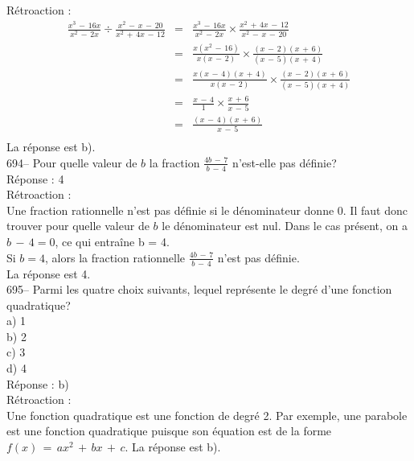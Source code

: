 ﻿\documentclass[letterpaper, 12pt]{article}
\begin{document}
R\'etroaction : \\
\begin{eqnarray*}
\frac{x^{3}\,-\,16x}{x^{2}\,-\,2x}\div
\frac{x^{2}\,-\,x\,-\,20}{x^{2}\,+\,4x\,-\,12}&=&\frac{x^{3}\,-\,16x}{x^{2}\,-\,2x}\times\frac{x^{2}\,+\,4x\,-\,12}{x^{2}\,-\,x\,-\,20}\\[2mm]
&=&\frac{x(x^{2}\,-\,16)}{x(x\,-\,2)}\times
\frac{(x\,-\,2)(x\,+\,6)}{(x\,-\,5)(x\,+\,4)}\\[2mm]
&=&\frac{x(x\,-\,4)(x\,+\,4)}{x(x\,-\,2)}\times\frac{(x\,-\,2)(x\,+\,6)}{(x\,-\,5)(x\,+\,4)}\\[2mm]
&=&\frac{x\,-\,4}{1}\times \frac{x\,+\,6}{x\,-\,5}\\[2mm]
&=&\frac{(x\,-\,4)(x\,+\,6)}{x\,-\,5}\\[2mm]
\end{eqnarray*}
La r\'eponse est b).\\

694-- Pour quelle valeur de $b$ la fraction $\frac{4b\,-\,7}{b\,-\,4}$
n'est-elle pas d\'efinie?\\

R\'eponse : 4\\

R\'etroaction : \\
Une fraction rationnelle n'est pas d\'efinie si le d\'enominateur donne 0.
Il faut donc trouver pour quelle valeur de $b$ le d\'enominateur est nul.
Dans le cas pr\'esent, on a $b\,-\,4=0$, ce qui entra\^ine b = 4.\\

Si $b=4$, alors la fraction rationnelle $\frac{4b\,-\,7}{b\,-\,4}$ n'est pas
d\'efinie.\\
La r\'eponse est 4.\\

695-- Parmi les quatre choix suivants, lequel repr\'esente le degr\'e d'une
fonction quadratique?\\
a) 1\\
b) 2\\
c) 3\\
d) 4\\

R\'eponse : b)\\

R\'etroaction : \\
Une fonction quadratique est une fonction de degr\'e 2.  Par exemple, une
parabole est une fonction quadratique puisque son \'equation est de la forme
$f(x)\,=\,ax^2 \,+\, bx \,+\, c$.  La r\'eponse est b).\\
\end{document}
